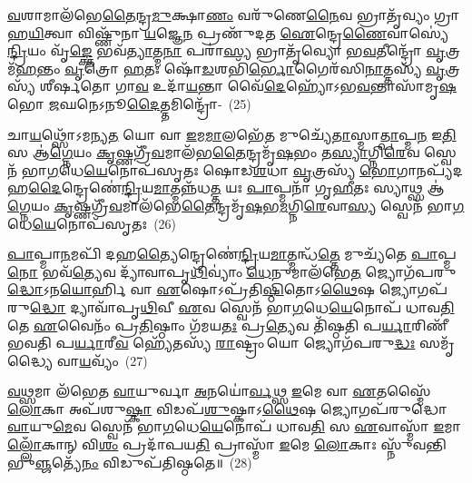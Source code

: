 \-\ul{𑌵}\-𑌶𑌾𑌮𑌾𑌲᳴𑌭𑍇\-\ul{𑌤𑍈}\-𑌨𑍍𑌦𑍍𑌰\-\ul{𑌮𑍁}\-𑌕𑍍𑌷𑌾\-\ul{𑌣𑌂} 𑌵𑌰𑍁᳴𑌣𑍇\-\ul{𑌨𑍈}\-𑌵 𑌭𑍍𑌰𑌾𑌤𑍃᳴𑌵𑍍𑌯𑌂 𑌗𑍍𑌰𑌾𑌹\-\ul{𑌯𑌿}\-𑌤𑍍𑌵𑌾 𑌵𑌿𑌷𑍍𑌣𑍁᳴𑌨𑌾 \ul{𑌯}\-𑌜𑍍𑌞𑍇\-\ul{𑌨} 𑌪𑍍𑌰𑌣𑍁᳴𑌦𑌤 \ul{𑌐}\-𑌨𑍍𑌦𑍍𑌰𑍇\-\ul{𑌣𑍈}\-𑌵𑌾𑌸𑍍𑌯𑍇॑\-\ul{𑌨𑍍𑌦𑍍𑌰𑌿}\-𑌯𑌂 𑌵𑍃᳴\-\ul{𑌙𑍍𑌕𑍍𑌤𑍇} 𑌭𑌵᳴\-\ul{𑌤𑍍𑌯𑌾}\-𑌤𑍍𑌮\-\ul{𑌨𑌾} 𑌪𑌰𑌾॑\-\ul{𑌸𑍍𑌯} 𑌭𑍍𑌰𑌾𑌤𑍃᳴𑌵𑍍𑌯𑍋 𑌭\-\ul{𑌵}\-𑌤𑍀𑌨𑍍𑌦𑍍𑌰𑍋᳴ \ul{𑌵𑍃}\-𑌤𑍍𑌰𑌮᳴\-\ul{𑌹}\-𑌨𑍍𑌤𑌂 \ul{𑌵𑍃}\-𑌤𑍍𑌰𑍋 \ul{𑌹}\-𑌤𑌃 𑌷𑍋᳴\-\ul{𑌡}\-𑌶𑌭𑌿᳴\-\ul{𑌰𑍍𑌭𑍋}\-𑌗𑍈𑌰᳴𑌸𑌿\-\ul{𑌨𑌾}\-𑌤𑍍𑌤𑌸𑍍𑌯᳴ \ul{𑌵𑍃}\-𑌤𑍍𑌰𑌸𑍍𑌯᳴ 𑌶𑍀𑌰𑍍\mbox{}\-\ul{𑌷}\-𑌤𑍋 𑌗𑌾\-\ul{𑌵} 𑌉𑌦𑌾᳴\-\ul{𑌯}\-𑌨𑍍𑌤𑌾 𑌵𑍈᳴\-\ul{𑌦𑍇}\-𑌹𑍍𑌯𑍋᳴\-𑌽𑌭\-\ul{𑌵}\-𑌨𑍍𑌤𑌾𑌸𑌾᳴𑌮𑍃\-\ul{𑌷}\-𑌭𑍋 \ul{𑌜}\-𑌘𑌨𑍇\-𑌽𑌨𑍂\-\ul{𑌦𑍈}\-𑌤𑍍𑌤𑌮𑌿𑌨𑍍𑌦𑍍𑌰𑍋᳴-~(25)

𑌚𑌾\-\ul{𑌯}\-𑌥𑍍𑌸𑍋᳴\-𑌽𑌮𑌨𑍍𑌯\-\ul{𑌤} 𑌯𑍋 𑌵𑌾 \ul{𑌇}\-𑌮\-\ul{𑌮𑌾}\-𑌲𑌭𑍇᳴\-\ul{𑌤} 𑌮𑍁𑌚𑍍𑌯𑍇᳴\-\ul{𑌤𑌾}\-𑌸𑍍𑌮𑌾\-\ul{𑌤𑍍𑌪𑌾}\-\-𑌪𑍍𑌮\-\ul{𑌨} 𑌇\-\ul{𑌤𑌿} 𑌸 𑌆॑\-\ul{𑌗𑍍𑌨𑍇}\-𑌯𑌂 \ul{𑌕𑍃}\-𑌷𑍍𑌣𑌗𑍍𑌰𑍀᳴\-\ul{𑌵}\-𑌮𑌾𑌲᳴𑌭\-\ul{𑌤𑍈}\-𑌨𑍍𑌦𑍍𑌰𑌮𑍃᳴\-\ul{𑌷}\-𑌭𑌂 𑌤\-\ul{𑌸𑍍𑌯𑌾}\-𑌗𑍍𑌨𑌿\-\ul{𑌰𑍇}\-𑌵 𑌸𑍍𑌵𑍇𑌨᳴ 𑌭𑌾\-\ul{𑌗}\-𑌧𑍇\-\ul{𑌯𑍇}\-𑌨𑍋𑌪᳴𑌸𑍃𑌤𑌃 𑌷𑍋𑌡\-\ul{𑌶}\-𑌧𑌾 \ul{𑌵𑍃}\-𑌤𑍍𑌰𑌸𑍍𑌯᳴ \ul{𑌭𑍋}\-𑌗𑌾𑌨𑌪𑍍𑌯᳴𑌦𑌹\-\-\ul{𑌦𑍈}\-𑌨𑍍𑌦𑍍𑌰𑍇𑌣𑍇॑\-\ul{𑌨𑍍𑌦𑍍𑌰𑌿}\-𑌯\-\-\ul{𑌮𑌾}\-𑌤𑍍𑌮𑌨𑍍𑌨᳴𑌧\-\ul{𑌤𑍍𑌤} 𑌯𑌃 \ul{𑌪𑌾}\-𑌪𑍍𑌮𑌨𑌾᳴ 𑌗𑍃\-\ul{𑌹𑍀}\-𑌤𑌃 𑌸𑍍𑌯𑌾𑌥𑍍𑌸 𑌆॑\-\ul{𑌗𑍍𑌨𑍇}\-𑌯𑌂 \ul{𑌕𑍃}\-𑌷𑍍𑌣𑌗𑍍𑌰𑍀᳴\-\ul{𑌵}\-𑌮𑌾𑌲᳴𑌭𑍇\-\ul{𑌤𑍈}\-𑌨𑍍𑌦𑍍𑌰𑌮𑍃᳴\-\ul{𑌷}\-𑌭\-\ul{𑌮}\-𑌗𑍍𑌨𑌿\-\ul{𑌰𑍇}\-𑌵𑌾\-\ul{𑌸𑍍𑌯} 𑌸𑍍𑌵𑍇𑌨᳴ 𑌭𑌾\-\ul{𑌗}\-𑌧𑍇\-\ul{𑌯𑍇}\-𑌨𑍋𑌪᳴𑌸𑍃𑌤𑌃~(26)

\-\ul{𑌪𑌾}\-𑌪𑍍𑌮𑌾\-\ul{𑌨}\-𑌮𑌪𑌿᳴ 𑌦𑌹\-\ul{𑌤𑍍𑌯𑍈}\-𑌨𑍍𑌦𑍍𑌰𑍇𑌣𑍇॑\-\ul{𑌨𑍍𑌦𑍍𑌰𑌿}\-𑌯\-\ul{𑌮𑌾}\-𑌤𑍍𑌮𑌨𑍍𑌧᳴\-\ul{𑌤𑍍𑌤𑍇} 𑌮𑍁𑌚𑍍𑌯᳴𑌤𑍇 \ul{𑌪𑌾}\-𑌪𑍍𑌮\-\ul{𑌨𑍋} 𑌭𑌵᳴\-\ul{𑌤𑍍𑌯𑍇}\-𑌵 𑌦𑍍𑌯𑌾᳴𑌵𑌾𑌪𑍃\-\ul{𑌥𑌿}\-𑌵𑍍𑌯𑌾𑌂॑ \ul{𑌧𑍇}\-𑌨𑍁𑌮𑌾\-𑌲᳴𑌭𑍇\-\ul{𑌤} 𑌜𑍍𑌯𑍋𑌗᳴𑌪𑌰𑍁\-\ul{𑌦𑍍𑌧𑍋}\-\-𑌽𑌨\-\ul{𑌯𑍋}\-𑌰𑍍\mbox{}𑌹𑌿 𑌵𑌾 \ul{𑌏}\-𑌷𑍋\-𑌽𑌪𑍍𑌰᳴𑌤𑌿\-\ul{𑌷𑍍𑌠𑌿}\-𑌤𑍋\-𑌽\-\ul{𑌥𑍈}\-𑌷 𑌜𑍍𑌯𑍋𑌗𑌪᳴𑌰𑍁\-\ul{𑌦𑍍𑌧𑍋} 𑌦𑍍𑌯𑌾𑌵𑌾᳴𑌪𑍃\-\ul{𑌥𑌿}\-𑌵𑍀 \ul{𑌏}\-𑌵 𑌸𑍍𑌵𑍇𑌨᳴ 𑌭𑌾\-\ul{𑌗}\-𑌧𑍇\-\ul{𑌯𑍇}\-𑌨𑍋𑌪᳴ 𑌧𑌾𑌵\-\ul{𑌤𑌿} 𑌤𑍇 \ul{𑌏}\-𑌵𑍈𑌨𑌂᳴ 𑌪𑍍𑌰\-\ul{𑌤𑌿}\-𑌷𑍍𑌠𑌾𑌂 𑌗᳴𑌮𑌯\-\ul{𑌤𑌃} 𑌪𑍍𑌰\-\ul{𑌤𑍍𑌯𑍇}\-𑌵 𑌤𑌿᳴𑌷𑍍𑌠𑌤𑌿 𑌪\-\ul{𑌰𑍍𑌯𑌾}\-𑌰𑌿𑌣𑍀᳴ 𑌭𑌵𑌤𑌿 𑌪\-\ul{𑌰𑍍𑌯𑌾}\-𑌰𑍀\-\ul{𑌵} 𑌹𑍍𑌯𑍇᳴𑌤𑌸𑍍𑌯᳴ \ul{𑌰𑌾}\-𑌷𑍍𑌟𑍍𑌰𑌂 𑌯𑍋 𑌜𑍍𑌯𑍋𑌗᳴𑌪𑌰𑍁\-\ul{𑌦𑍍𑌧𑌃} 𑌸𑌮𑍃᳴𑌦𑍍𑌧𑍍𑌯𑍈 𑌵𑌾\-\ul{𑌯}\-𑌵𑍍𑌯𑌂᳴~(27)

\-\ul{𑌵}\-𑌥𑍍𑌸𑌮𑌾 𑌲᳴𑌭𑍇𑌤 \ul{𑌵𑌾}\-𑌯𑍁𑌰𑍍𑌵𑌾 \ul{𑌅}\-𑌨𑌯𑍋॑\-\ul{𑌰𑍍𑌵}\-𑌥𑍍𑌸 \ul{𑌇}\-𑌮𑍇 𑌵𑌾 \ul{𑌏}\-𑌤𑌸𑍍𑌮𑍈᳴ \ul{𑌲𑍋}\-𑌕𑌾 𑌅𑌪᳴𑌶𑍁\-\ul{𑌷𑍍𑌕𑌾} 𑌵𑌿𑌡𑌪᳴\-\ul{𑌶𑍁}\-𑌷𑍍𑌕𑌾\-𑌽\-\ul{𑌥𑍈}\-𑌷 𑌜𑍍𑌯𑍋𑌗𑌪᳴𑌰𑍁𑌦𑍍𑌧𑍋 \ul{𑌵𑌾}\-𑌯𑍁\-\ul{𑌮𑍇}\-𑌵 𑌸𑍍𑌵𑍇𑌨᳴ 𑌭𑌾\-\ul{𑌗}\-𑌧𑍇\-\ul{𑌯𑍇}\-𑌨𑍋𑌪᳴ 𑌧𑌾𑌵\-\ul{𑌤𑌿} 𑌸 \ul{𑌏}\-𑌵𑌾𑌸𑍍𑌮𑌾᳴ \ul{𑌇}\-𑌮𑌾\-\ul{𑌲𑍍𑌲𑍋𑌁}\-𑌕𑌾𑌨𑍍 𑌵𑌿\-\ul{𑌶𑌂} 𑌪𑍍𑌰𑌦𑌾᳴𑌪𑌯\-\ul{𑌤𑌿} 𑌪𑍍𑌰𑌾𑌸𑍍𑌮𑌾᳴ \ul{𑌇}\-𑌮𑍇 \ul{𑌲𑍋}\-𑌕𑌾𑌃 𑌸𑍍𑌨𑍁᳴𑌵𑌨𑍍𑌤𑌿 𑌭𑍁\-\ul{𑌞𑍍𑌜}\-𑌤𑍍𑌯𑍇᳴\-\ul{𑌨𑌂} 𑌵𑌿𑌡𑍁𑌪᳴𑌤𑌿𑌷𑍍𑌠𑌤𑍇॥~(28)

{\anuvakamend[{\-\ul{𑌮}\-𑌧𑍍𑌯𑌨𑍍𑌦𑌿᳴\-\ul{𑌨𑍇} 𑌕𑌦𑍍𑌰𑍁𑌂᳴ \ul{𑌯}\-𑌮\-\ul{𑌸𑍍𑌯} 𑌸𑍍𑌪𑌰𑍍𑌧᳴𑌮𑌾𑌨𑍋 𑌵𑍈𑌷𑍍𑌣𑌾𑌵\-\ul{𑌰𑍁}\-𑌣𑍀𑌨𑍍𑌤𑌮𑌿𑌨𑍍𑌦𑍍𑌰𑍋॑\-𑌽\-\ul{𑌸𑍍𑌯} 𑌸𑍍𑌵𑍇𑌨᳴ 𑌭𑌾\-\ul{𑌗}\-𑌧𑍇\-\ul{𑌯𑍇}\-𑌨𑍋𑌪᳴𑌸𑍃𑌤𑍋 𑌵𑌾\-\ul{𑌯}\-𑌵𑍍𑌯𑌂᳴ 𑌦𑍍𑌵𑌿𑌚᳴𑌤𑍍𑌵𑌾𑌰𑌿𑍞𑌶𑌚𑍍𑌚।~(4)।}]}

